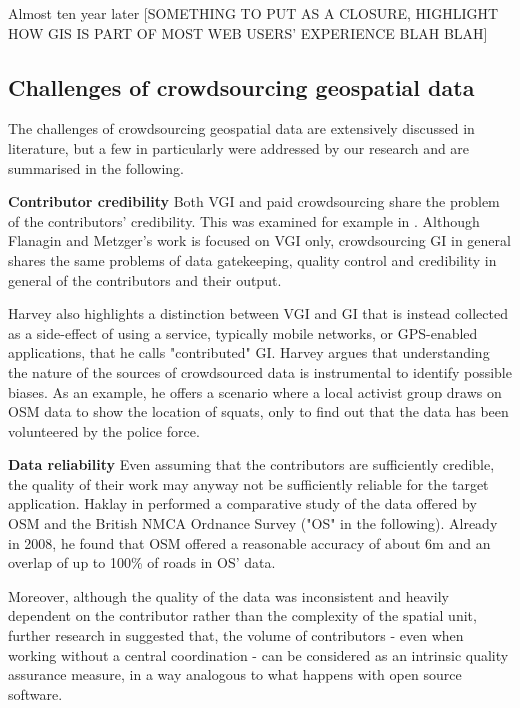 Almost ten year later [SOMETHING TO PUT AS A CLOSURE, HIGHLIGHT HOW GIS IS PART OF MOST WEB USERS' EXPERIENCE BLAH BLAH] 

 \subsection{Challenges of crowdsourcing geospatial data}
 \label{challenges-of-crowdsourcing-geospatial-data}

The challenges of crowdsourcing geospatial data are extensively discussed in literature, but a few in particularly were addressed by our research and are summarised in the following.

\textbf{Contributor credibility} Both VGI and paid crowdsourcing share the problem of the contributors' credibility. This was examined for example in \cite{Flanagin:2008ck}. Although Flanagin and Metzger's work is focused on VGI only, crowdsourcing GI in general shares the same problems of data gatekeeping, quality control and credibility in general of the contributors and their output. 

Harvey \cite{Harvey:2012wsa} also highlights a distinction between VGI and GI that is instead collected as a side-effect of using a service, typically mobile networks, or GPS-enabled applications, that he calls "contributed" GI. Harvey argues that understanding the nature of the sources of crowdsourced data is instrumental to identify possible biases. As an example, he offers a scenario where a local activist group draws on OSM data to show the location of squats, only to find out that the data has been volunteered by the police force. 

\textbf{Data reliability} Even assuming that the contributors are sufficiently credible, the quality of their work may anyway not be sufficiently reliable for the target application. Haklay in \cite{Haklay:2010vs} performed a comparative study of the data offered by OSM and the British NMCA Ordnance Survey ("OS" in the following). Already in 2008, he found that OSM offered a reasonable accuracy of about 6m and an overlap of up to 100\% of roads in OS' data. 

Moreover, although the quality of the data was inconsistent and heavily dependent on the contributor rather than the complexity of the spatial unit, further research in  \cite{Haklay:2010wf} suggested that, the volume of contributors - even when working without a central coordination - can be considered as an intrinsic quality assurance measure, in a way analogous to what happens with open source software.

